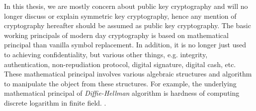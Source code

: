     
    
    In this thesis, we are mostly concern about public key cryptography and will no longer discuss or explain 
    symmetric key cryptography, hence any mention of cryptography hereafter should be assumed as
    public key cryptography. 
    The basic working principals of modern day cryptography is based on 
    mathematical principal than vanilla symbol replacement. 
    In addition, it is no longer just 
    used to achieving confidentiality, but various other things, e.g. integrity,  authentication, non-repudiation 
    protocol, digital signature, digital cash, etc.
    These mathematical principal involves 
    various algebraic structures and algorithm to manipulate the object from these structures.
    For example, the underlying mathematical principal of \textit{Diffie-Hellman}  algorithm 
    is hardness of computing discrete logarithm in finite field. .
    
    
    
    
%    
%    
%   
%    
    
